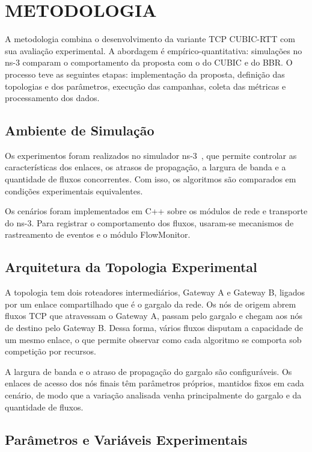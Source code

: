 \chapter{METODOLOGIA}

A metodologia combina o desenvolvimento da variante TCP CUBIC-RTT com sua avaliação experimental. A abordagem é empírico-quantitativa: simulações no ns-3 comparam o comportamento da proposta com o do CUBIC e do BBR. O processo teve as seguintes etapas: implementação da proposta, definição das topologias e dos parâmetros, execução das campanhas, coleta das métricas e processamento dos dados.

\section{Ambiente de Simulação}

Os experimentos foram realizados no simulador ns-3~\cite{ns3}, que permite controlar as características dos enlaces, os atrasos de propagação, a largura de banda e a quantidade de fluxos concorrentes. Com isso, os algoritmos são comparados em condições experimentais equivalentes.

Os cenários foram implementados em C++ sobre os módulos de rede e transporte do ns-3. Para registrar o comportamento dos fluxos, usaram-se mecanismos de rastreamento de eventos e o módulo FlowMonitor.

\section{Arquitetura da Topologia Experimental}

A topologia tem dois roteadores intermediários, Gateway A e Gateway B, ligados por um enlace compartilhado que é o gargalo da rede. Os nós de origem abrem fluxos TCP que atravessam o Gateway A, passam pelo gargalo e chegam aos nós de destino pelo Gateway B. Dessa forma, vários fluxos disputam a capacidade de um mesmo enlace, o que permite observar como cada algoritmo se comporta sob competição por recursos.

A largura de banda e o atraso de propagação do gargalo são configuráveis. Os enlaces de acesso dos nós finais têm parâmetros próprios, mantidos fixos em cada cenário, de modo que a variação analisada venha principalmente do gargalo e da quantidade de fluxos.

\section{Parâmetros e Variáveis Experimentais}

